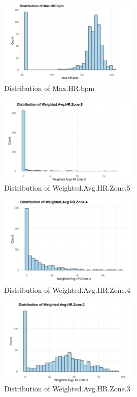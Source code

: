 \documentclass{article}
\begin{document}
\begin{figure}[h!]
  \centering
  \includegraphics[width=0.6\textwidth]{images/Max_HR_bpm.png}
  \caption{Distribution of Max.HR.bpm}
  \label{fig:max_hr_bpm}
\end{figure}

\begin{figure}[h!]
  \centering
  \includegraphics[width=0.6\textwidth]{images/Weighted_Avg_HR_Zone_5.png}
  \caption{Distribution of Weighted.Avg.HR.Zone.5}
  \label{fig:weighted_avg_hr_zone_5}
\end{figure}

\begin{figure}[h!]
  \centering
  \includegraphics[width=0.6\textwidth]{images/Weighted_Avg_HR_Zone_4.png}
  \caption{Distribution of Weighted.Avg.HR.Zone.4}
  \label{fig:weighted_avg_hr_zone_4}
\end{figure}

\begin{figure}[h!]
  \centering
  \includegraphics[width=0.6\textwidth]{images/Weighted_Avg_HR_Zone_3.png}
  \caption{Distribution of Weighted.Avg.HR.Zone.3}
  \label{fig:weighted_avg_hr_zone_3}
\end{figure}
\end{document}
